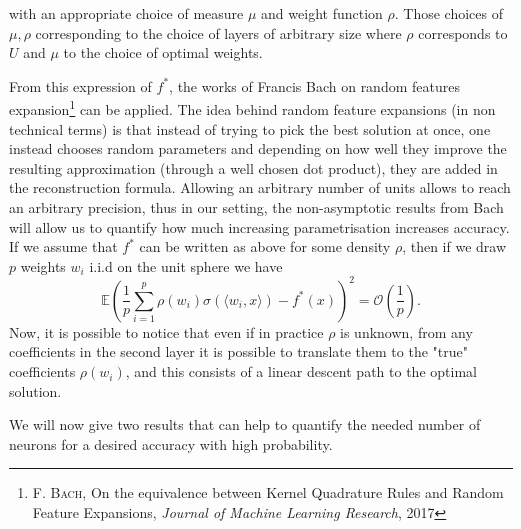 \documentclass[11pt]{article} %
\begin{document}
with an appropriate choice of measure $\mu$ and weight function $\rho$. Those choices of $\mu, \rho$ corresponding to the choice of layers of arbitrary size where $\rho$ corresponds to $U$ and $\mu$ to the choice of optimal weights.
\par
From this expression of $f^*$, the works of Francis Bach on random features expansion\footnote{\textsc{F. Bach},  On the equivalence between Kernel Quadrature Rules and Random Feature Expansions, \emph{Journal of Machine Learning Research}, 2017} can be applied. The idea behind random feature expansions (in non technical terms) is that instead of trying to pick the best solution at once, one instead chooses random parameters and depending on how well they improve the resulting approximation (through a well chosen dot product), they are added in the reconstruction formula. Allowing an arbitrary number of units allows to reach an arbitrary precision, thus in our setting, the non-asymptotic results from Bach will allow us to quantify how much increasing parametrisation increases accuracy. 
\newline
If we assume that $f^*$ can be written as above for some density $\rho$, then if we draw $p$ weights $w_i$ i.i.d on the unit sphere we have
\begin{equation}
	\mathbb{E}\left( \frac{1}{p}\sum_{i=1}^p \rho(w_i)\sigma(\langle w_i, x\rangle) - f^*(x)\right)^2 = \mathcal{O}(\frac{1}{p}).
\end{equation}
Now, it is possible to notice that even if in practice $\rho$ is unknown, from any coefficients in the second layer it is possible to translate them to the "true" coefficients $\rho(w_i)$, and this consists of a linear descent path to the optimal solution.
\par
We will now give two results that can help to quantify the needed number of neurons for a desired accuracy with high probability.
\end{document}
